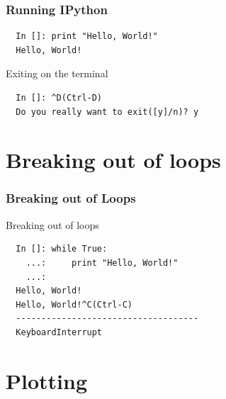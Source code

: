 \documentclass[14pt,compress]{beamer}
\newcounter{time}
\newcommand{\inctime}[1]{\addtocounter{time}{#1}{\tiny \thetime\ m}}
\begin{document}
\begin{frame}[fragile]
\frametitle{Running IPython}
\begin{lstlisting}
  In []: print "Hello, World!"
  Hello, World!
\end{lstlisting}

Exiting on the terminal
\begin{lstlisting}
  In []: ^D(Ctrl-D)
  Do you really want to exit([y]/n)? y
\end{lstlisting}
\end{frame}


\section{Breaking out of loops}
\begin{frame}[fragile]
\frametitle{Breaking out of Loops}
Breaking out of loops
\begin{lstlisting}     
  In []: while True:
    ...:     print "Hello, World!"
    ...:     
  Hello, World!
  Hello, World!^C(Ctrl-C)
  ------------------------------------
  KeyboardInterrupt                   
\end{lstlisting}
  \inctime{10}
\end{frame}

\section{Plotting}
\end{document}
